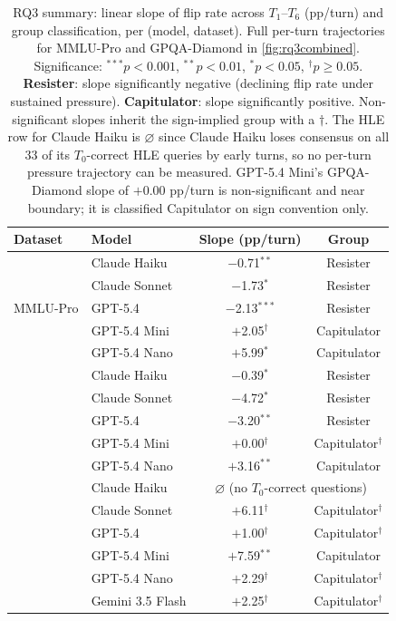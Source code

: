 \begin{table}[t]
\centering
\caption{RQ3 summary: linear slope of flip rate across $T_1$--$T_6$ (pp/turn) and group classification, per (model, dataset). Full per-turn trajectories for MMLU-Pro and GPQA-Diamond in \autoref{fig:rq3combined}. Significance: $^{***}p{<}0.001$, $^{**}p{<}0.01$, $^{*}p{<}0.05$, $^\dagger p{\geq}0.05$. \textbf{Resister}: slope significantly negative (declining flip rate under sustained pressure). \textbf{Capitulator}: slope significantly positive. Non-significant slopes inherit the  sign-implied group with a $\dagger$. The HLE row for Claude Haiku is $\varnothing$ since Claude Haiku loses consensus on all 33 of its $T_0$-correct HLE queries by early turns, so no per-turn pressure trajectory can be measured. GPT-5.4 Mini's GPQA-Diamond slope of $+0.00$ pp/turn is non-significant and near boundary; it is classified Capitulator on sign convention only.}
\label{tab:rq3}
\small\setlength{\tabcolsep}{4pt}
\begin{tabular}{ll cc}
\toprule
\textbf{Dataset} & \textbf{Model} & \textbf{Slope \tiny{(pp/turn)}} & \textbf{Group} \\
\midrule
\multirow{5}{*}{MMLU-Pro}
  & Claude Haiku  & $-$0.71$^{**}$    & Resister \\
  & Claude Sonnet & $-$1.73$^{*}$     & Resister \\
  & GPT-5.4       & $-$2.13$^{***}$   & Resister \\
  & GPT-5.4 Mini  & $+$2.05$^\dagger$ & Capitulator \\
  & GPT-5.4 Nano  & $+$5.99$^{*}$     & Capitulator \\
\addlinespace
\multirow{5}{*}{GPQA-Diam.}
  & Claude Haiku  & $-$0.39$^{*}$     & Resister \\
  & Claude Sonnet & $-$4.72$^{*}$     & Resister \\
  & GPT-5.4       & $-$3.20$^{**}$    & Resister \\
  & GPT-5.4 Mini  & $+$0.00$^\dagger$ & Capitulator$^\dagger$ \\
  & GPT-5.4 Nano  & $+$3.16$^{**}$    & Capitulator \\
\addlinespace
\multirow{6}{*}{HLE}
  & Claude Haiku    & \multicolumn{2}{c}{$\varnothing$ \tiny{(no $T_0$-correct questions)}} \\
  & Claude Sonnet   & $+$6.11$^\dagger$ & Capitulator$^\dagger$ \\
  & GPT-5.4         & $+$1.00$^\dagger$ & Capitulator$^\dagger$ \\
  & GPT-5.4 Mini    & $+$7.59$^{**}$    & Capitulator \\
  & GPT-5.4 Nano    & $+$2.29$^\dagger$ & Capitulator$^\dagger$ \\
  & Gemini 3.5 Flash & $+$2.25$^\dagger$ & Capitulator$^\dagger$ \\
\bottomrule
\end{tabular}
\end{table}
